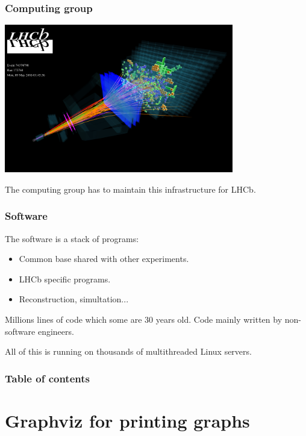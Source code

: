 \documentclass{beamer}
\begin{document}
    \begin{frame}
        \frametitle{Computing group}

        \includegraphics[width=0.75\textwidth]{LHCb_3D.png}

        The computing group has to maintain this infrastructure for LHCb.
    \end{frame}

    \begin{frame}
        \frametitle{Software}

        The software is a stack of programs:

        \begin{itemize}
            \item Common base shared with other experiments.
            \item LHCb specific programs.
            \item Reconstruction, simultation...
        \end{itemize}

        Millions lines of code which some are 30 years old.
        Code mainly written by non-software engineers.

        All of this is running on thousands of multithreaded Linux servers.
    \end{frame}

    \begin{frame}
        \frametitle{Table of contents}
        \tableofcontents
    \end{frame}

\section{Graphviz for printing graphs}

    \begin{frame}
        \tableofcontents[currentsection]
    \end{frame}
\end{document}
